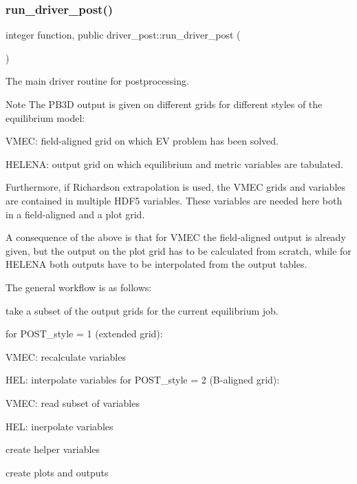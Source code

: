 \subsubsection{\texorpdfstring{run\+\_\+driver\+\_\+post()}{run\_driver\_post()}}
{\footnotesize\ttfamily integer function, public driver\+\_\+post\+::run\+\_\+driver\+\_\+post (\begin{DoxyParamCaption}{ }\end{DoxyParamCaption})}



The main driver routine for postprocessing. 

\begin{DoxyNote}{Note}
The P\+B3D output is given on different grids for different styles of the equilibrium model\+:
\begin{DoxyItemize}
\item V\+M\+EC\+: field-\/aligned grid on which EV problem has been solved.
\item H\+E\+L\+E\+NA\+: output grid on which equilibrium and metric variables are tabulated.
\end{DoxyItemize}
\end{DoxyNote}
Furthermore, if Richardson extrapolation is used, the V\+M\+EC grids and variables are contained in multiple H\+D\+F5 variables. These variables are needed here both in a field-\/aligned and a plot grid.

A consequence of the above is that for V\+M\+EC the field-\/aligned output is already given, but the output on the plot grid has to be calculated from scratch, while for H\+E\+L\+E\+NA both outputs have to be interpolated from the output tables.

The general workflow is as follows\+:
\begin{DoxyItemize}
\item take a subset of the output grids for the current equilibrium job.
\item for {\ttfamily P\+O\+S\+T\+\_\+style = 1} (extended grid)\+:
\begin{DoxyItemize}
\item V\+M\+EC\+: recalculate variables
\item H\+EL\+: interpolate variables for {\ttfamily P\+O\+S\+T\+\_\+style = 2} (B-\/aligned grid)\+:
\item V\+M\+EC\+: read subset of variables
\item H\+EL\+: inerpolate variables
\end{DoxyItemize}
\item create helper variables
\item create plots and outputs
\end{DoxyItemize}

